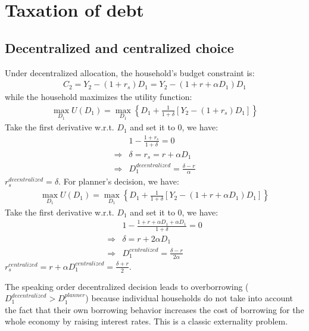 \documentclass[a4paper,12pt]{article} %
\theoremstyle{nonitalic}
\begin{document}
\section{Taxation of debt}

\subsection{Decentralized and centralized choice}

Under decentralized allocation, the household's budget constraint is:
\begin{gather*}
    C_2= Y_2 - (1 + r_s)D_1 = Y_2 - (1 + r + \alpha D_1)D_1 
\end{gather*}
while the household maximizes the utility function:
\begin{gather*}
    \max_{D_1} U(D_1) = \max_{D_1} \left\{ D_1 + \frac{1}{1 + \delta} \left[ Y_2 - (1 + r_s)D_1 \right] \right\} 
\end{gather*}
Take the first derivative w.r.t. $D_1$ and set it to 0, we have:
\begin{align*}
    & 1 - \frac{1 + r_s}{1+\delta} = 0 \\
    \Rightarrow & \delta = r_s = r + \alpha D_1 \\
    \Rightarrow & D_1^{decentralized} = \frac{\delta - r}{\alpha}
\end{align*}
$r_s^{decentralized} = \delta.$
For planner's decision, we have:
\begin{gather*}
    \max_{D_1} U(D_1) = \max_{D_1} \left\{ D_1 + \frac{1}{1 + \delta} \left[ Y_2 - (1 + r + \alpha D_1)D_1 \right] \right\} 
\end{gather*}
Take the first derivative w.r.t. $D_1$ and set it to 0, we have:
\begin{align*}
    & 1 - \frac{1 + r + \alpha D_1 + \alpha D_1}{1+\delta} = 0 \\
    \Rightarrow & \delta = r + 2 \alpha D_1 \\
    \Rightarrow & D_1^{centralized} = \frac{\delta - r}{2 \alpha}
\end{align*}
$r_s^{centralized} = r + \alpha D_1^{centralized} = \frac{\delta + r}{2}$.

The speaking order decentralized decision leads to overborrowing ($D_1^{decentralized} > D_1^{planner}$)
because individual households do not take into account the fact that their own borrowing behavior 
increases the cost of borrowing for the whole economy by raising interest rates. 
This is a classic externality problem.
\end{document}
